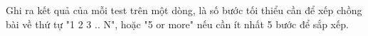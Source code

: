 Ghi ra kết quả của mỗi test trên một dòng, là số bước tối thiểu cần để xếp chồng bài về thứ tự "1 2 3 .. N", hoặc "5 or more" nếu cần ít nhất 5 bước để sắp xếp.